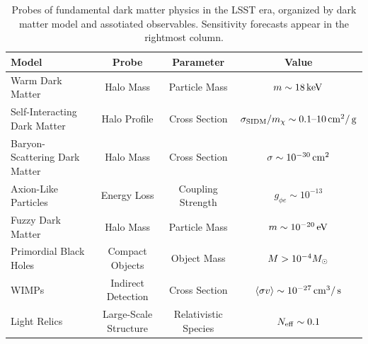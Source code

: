 \documentclass[12pt]{article}
\begin{document}
\begin{table}[ht]
\footnotesize
\begin{center}
\begin{tabular}{l c c c}
\hline 
Model & Probe & Parameter & Value \\
\hline 
\hline
Warm Dark Matter  & Halo Mass & Particle Mass & $m \sim 18 \mathrm{\,keV}$ \\
Self-Interacting Dark Matter & Halo Profile & Cross Section & $\sigma_{\rm SIDM}/m_\chi \sim 0.1\text{--}10\mathrm{\,cm}^2/\mathrm{\,g}$ \\
Baryon-Scattering Dark Matter & Halo Mass & Cross Section & $\sigma \sim 10^{-30} \mathrm{\,cm}^2$ \\
Axion-Like Particles & Energy Loss & Coupling Strength & $g_{\phi e} \sim 10^{-13} $ \\
Fuzzy Dark Matter & Halo Mass & Particle Mass & $m \sim 10^{-20} \mathrm{\,eV}$  \\
Primordial Black Holes  & Compact Objects & Object Mass & $M > 10^{-4} M_\odot$ \\
WIMPs & Indirect Detection & Cross Section & $\langle \sigma v \rangle \sim 10^{-27} \mathrm{\,cm}^3/\mathrm{\,s}$ \\
Light Relics & Large-Scale Structure & Relativistic Species & $N_{\rm eff} \sim 0.1$ \\[+0.5em]
\hline
\end{tabular}
\end{center}
\vspace{-1em}
\caption{\label{tab:models} Probes of fundamental dark matter physics in the LSST era, organized by dark matter model and assotiated observables. Sensitivity forecasts appear in the rightmost column.}


\end{table}


\end{document}
